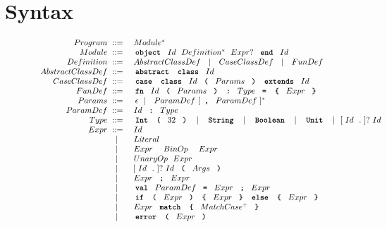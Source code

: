 \section{Syntax}
\label{sec:syntax}
\def\alt{~~|~~}

\def\Expr{\gnt{Expr}}
\def\Id{\gnt{Id}}
\def\ID{\gnt{ID}}
\def\({\gt{(}}
\def\){\gt{)}}

\begin{figure}
\begin{equation*}
\begin{array}{rl}
\gnt{Program} \gpo & \gnt{Module^*} \\
\gnt{Module} \gpo & \gt{object} \Id  \gnt{Definition^*} \gnt{Expr?} \gt{end} \Id \\
\gnt{Definition} \gpo & \gnt{AbstractClassDef} \alt \gnt{CaseClassDef} \alt \gnt{FunDef} \\
\gnt{AbstractClassDef} \gpo & \gt{abstract} \gt{class} \Id \\
\gnt{CaseClassDef} \gpo & \gt{case} \gt{class} \Id \( \gnt{Params} \) \gt{extends} \Id \\
\gnt{FunDef} \gpo & \gt{fn} \gnt{Id} \( \gnt{Params} \) \gt{:} \gnt{Type} \gt{=} \gt{\{} \Expr \gt{\}} \\
    \gnt{Params} \gpo & \ \, \epsilon \alt \gnt{ParamDef} [\gt{,} \gnt{ParamDef}]^* \\
\gnt{ParamDef} \gpo & \gnt{Id} \gt{:} \gnt{Type} \\
\gnt{Type} \gpo & \gt{Int} \( \gnt{32} \) \alt \gt{String} \alt \gt{Boolean} \alt \gt{Unit} \alt [\Id \gnt{.}]? \Id \\
\gnt{Expr}  \gpo & \Id \\
            \alt & \gnt{Literal} \\
            \alt & \Expr\ \ \gnt{BinOp}\ \ \Expr    \\
            \alt & \gnt{UnaryOp} \Expr \\
            \alt & \; [\Id \gnt{.}]? \Id \( \gnt{Args} \) \\
            \alt & \Expr \gt{;} \Expr   \\
            \alt & \gt{val} \gnt{ParamDef} \gt{=} \gnt{Expr} \gt{;} \gnt{Expr} \\
            \alt & \gt{if} \( \Expr \) \gt{\{} \gnt{Expr} \gt{\}} \gt{else} \gt{\{} \gnt{Expr} \gt{\}} \\
            \alt & \Expr \gt{match} \gt{\{} \gnt{MatchCase^+} \gt{\}} \\
            \alt & \gt{error} \gt{(} \Expr \gt{)} \\

\end{array}
\end{equation*}
\end{figure}
